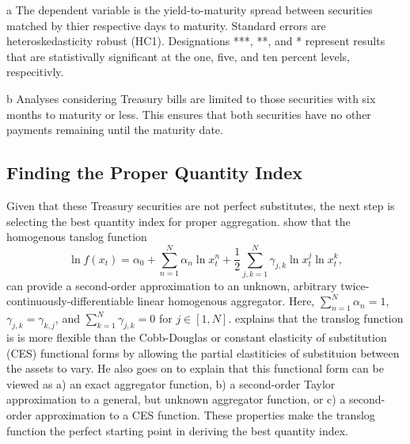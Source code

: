 \documentclass[11pt,a4paper,margin=1.5in]{article}
\begin{document}
\begin{table}[h]
\begin{threeparttable}
\begin{tabular}{l d{2.4} d{2.4} d{2.4}}
		\end{tabular}
		\begin{tablenotes}
			\item[a] \footnotesize{The dependent variable is the yield-to-maturity spread between securities matched by thier respective days to maturity. Standard errors are heteroskedasticity robust (HC1). Designations ***, **, and * represent results that are statistivally significant at the one, five, and ten percent levels, respecitivly.}
			\item[b] \footnotesize{Analyses considering Treasury bills are limited to those securities with six months to maturity or less. This ensures that both securities have no other payments remaining until the maturity date.}
		\end{tablenotes}
	\end{threeparttable}
\end{table}




\subsection{Finding the Proper Quantity Index}
\label{subsec:Hurdles}
Given that these Treasury securities are not perfect substitutes, the next step is selecting the best quantity index for proper aggregation.
\citet{Christensen-Jorgenson-Lau:1971} show that the homogenous tanslog function 
$$ \ln f(x_t) = \alpha_0 + \sum_{n=1}^N \alpha_n \ln x^n_t + \frac{1}{2}\sum_{j,k=1}^N \gamma_{j,k} \ln x^j_t \ln x^k_t, $$
can provide a second-order approximation to an unknown, arbitrary twice-continuously-differentiable linear homogenous aggregator.
Here, $\sum_{n=1}^{N} \alpha_n = 1$, $\gamma_{j,k} = \gamma_{k,j}$, and $\sum_{k=1}^{N} \gamma_{j,k} = 0$ for $j \in [1,N]$.
\citet{Boisvert:1982} explains that the translog function is is more flexible than the Cobb-Douglas or constant elasticity of substitution (CES) functional forms by allowing the partial elastiticies of substituion between the assets to vary.
He also goes on to explain that this functional form can be viewed as a) an exact aggregator function, b) a second-order Taylor approximation to a general, but unknown aggregator function, or c) a second-order approximation to a CES function.
These properties make the translog function the perfect starting point in deriving the best quantity index.
\end{document}
